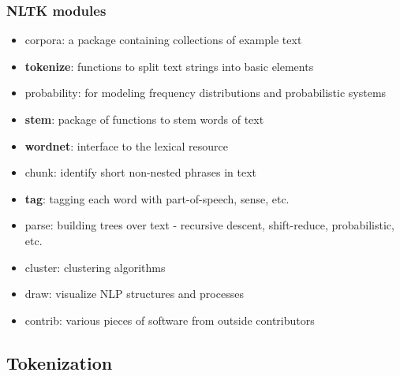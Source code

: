 \documentclass{beamer}
\begin{document}
\begin{frame}

\frametitle{NLTK modules}

	\begin{itemize}
			
		\item corpora: a package containing collections of example text 
		\item {\bf tokenize}: functions to split text strings into basic elements
		\item probability: for modeling frequency distributions and probabilistic systems 
		\item {\bf stem}:  package of functions to stem words of text 
		\item {\bf wordnet}: interface to the {} lexical resource 
		\item chunk: identify short non-nested phrases in text 
		\item {\bf tag}: tagging each word with part-of-speech, sense, etc. 
		\item parse: building trees over text - recursive descent, shift-reduce, probabilistic, etc. 
		\item cluster: clustering algorithms 
		\item draw: visualize NLP structures and processes 
		\item contrib: various pieces of software from outside contributors 

	\end{itemize}

\end{frame}


\subsection{Tokenization}
\end{document}
